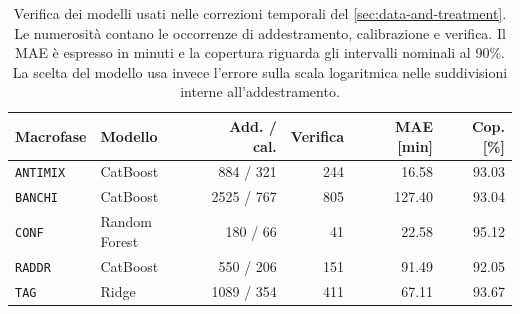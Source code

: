 \begin{table}[htbp]
\centering
\small
\setlength{\tabcolsep}{4pt}
\begin{tabularx}{\linewidth}{@{}Xlrrrr@{}}
\toprule
\textbf{Macrofase} & \textbf{Modello} & \textbf{Add. / cal.} & \textbf{Verifica} & \textbf{MAE [min]} & \textbf{Cop. [\%]}\\
\midrule
\texttt{ANTIMIX} & CatBoost & \num{884} / \num{321} & \num{244} & \num{16.58} & \num{93.03} \\
\texttt{BANCHI} & CatBoost & \num{2525} / \num{767} & \num{805} & \num{127.40} & \num{93.04} \\
\texttt{CONF} & Random Forest & \num{180} / \num{66} & \num{41} & \num{22.58} & \num{95.12} \\
\texttt{RADDR} & CatBoost & \num{550} / \num{206} & \num{151} & \num{91.49} & \num{92.05} \\
\texttt{TAG} & Ridge & \num{1089} / \num{354} & \num{411} & \num{67.11} & \num{93.67} \\
\bottomrule
\end{tabularx}
\caption{Verifica dei modelli usati nelle correzioni temporali del \cref{sec:data-and-treatment}. Le numerosità contano le occorrenze di addestramento, calibrazione e verifica. Il MAE è espresso in minuti e la copertura riguarda gli intervalli nominali al 90\%. La scelta del modello usa invece l'errore sulla scala logaritmica nelle suddivisioni interne all'addestramento.}
\label{tab:duration-correction-validation}
\end{table}
